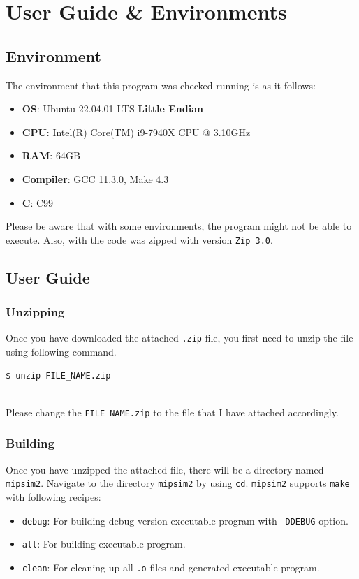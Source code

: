 \documentclass{homework}
\begin{document}
\pagebreak
\section{User Guide \& Environments}
\subsection{Environment}
The environment that this program was checked running is as it follows:
\begin{itemize}
    \item \textbf{OS}: Ubuntu 22.04.01 LTS \textbf{Little Endian}
    \item \textbf{CPU}: Intel(R) Core(TM) i9-7940X CPU @ 3.10GHz
    \item \textbf{RAM}: 64GB
    \item \textbf{Compiler}: GCC 11.3.0, Make 4.3
    \item \textbf{C}: C99
\end{itemize}

Please be aware that with some environments, the program might not be able to execute. Also, with the code was zipped with version \texttt{Zip 3.0}. 

\subsection{User Guide}
\subsubsection{Unzipping}
Once you have downloaded the attached \texttt{.zip} file, you first need to unzip the file using following command.
\\
\begin{center}
\begin{code}
\begin{verbatim}
$ unzip FILE_NAME.zip
\end{verbatim}
\end{code}
\end{center}
\\
Please change the \texttt{FILE\_NAME.zip} to the file that I have attached accordingly.

\subsubsection{Building}
Once you have unzipped the attached file, there will be a directory named \texttt{mipsim2}. Navigate to the directory \texttt{mipsim2} by using \texttt{cd}. \texttt{mipsim2} supports \texttt{make} with following recipes:
\begin{itemize}
    \item \texttt{debug}: For building debug version executable program with \texttt{--DDEBUG} option.
    \item \texttt{all}: For building executable program.
    \item \texttt{clean}: For cleaning up all \texttt{.o} files and generated executable program.
\end{itemize}
\end{document}
